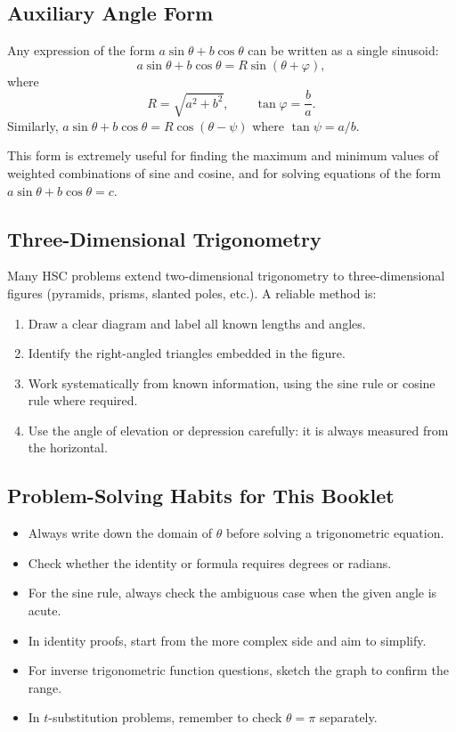 \documentclass[12pt]{article}
\begin{document}
\subsection{Auxiliary Angle Form}

Any expression of the form $a\sin\theta + b\cos\theta$ can be written as a single sinusoid:
\[
a\sin\theta + b\cos\theta = R\sin(\theta + \varphi),
\]
where
\[
R = \sqrt{a^2+b^2}, \qquad \tan\varphi = \frac{b}{a}.
\]
Similarly, $a\sin\theta + b\cos\theta = R\cos(\theta - \psi)$ where $\tan\psi = a/b$.

This form is extremely useful for finding the maximum and minimum values of weighted combinations of sine and cosine, and for solving equations of the form $a\sin\theta + b\cos\theta = c$.

\subsection{Three-Dimensional Trigonometry}

Many HSC problems extend two-dimensional trigonometry to three-dimensional figures (pyramids, prisms, slanted poles, etc.). A reliable method is:
\begin{enumerate}[leftmargin=*]
  \item Draw a clear diagram and label all known lengths and angles.
  \item Identify the right-angled triangles embedded in the figure.
  \item Work systematically from known information, using the sine rule or cosine rule where required.
  \item Use the angle of elevation or depression carefully: it is always measured from the horizontal.
\end{enumerate}

\subsection{Problem-Solving Habits for This Booklet}
\begin{itemize}[leftmargin=*]
  \item Always write down the domain of $\theta$ before solving a trigonometric equation.
  \item Check whether the identity or formula requires degrees or radians.
  \item For the sine rule, always check the ambiguous case when the given angle is acute.
  \item In identity proofs, start from the more complex side and aim to simplify.
  \item For inverse trigonometric function questions, sketch the graph to confirm the range.
  \item In $t$-substitution problems, remember to check $\theta = \pi$ separately.
\end{itemize}
\end{document}
